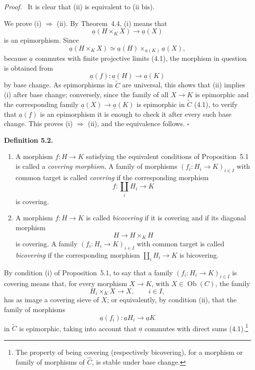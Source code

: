 \documentclass[11pt]{article}
\newcommand{\Ob}{\operatorname{Ob}}
\newcommand{\qedtext}{\hfill\(\square\)}
\newenvironment{statement}[1]{\par\medskip\noindent\textbf{#1.}\ }{\par\medskip}
\newenvironment{prooftext}{\par\noindent\emph{Proof.}\ }{\par\medskip}
\begin{document}
\begin{prooftext}
It is clear that (ii) is equivalent to (ii bis).

We prove (i) \(\Rightarrow\) (ii). By Theorem~4.4, (i) means that
\[
\underline a(H\times_KX)\to \underline a(X)
\]
is an epimorphism. Since
\[
\underline a(H\times_KX)\simeq
\underline a(H)\times_{\underline a(K)}\underline a(X),
\]
because \(\underline a\) commutes with finite projective limits (4.1), the morphism in question is obtained from
\[
\underline a(f):\underline a(H)\to \underline a(K)
\]
by base change. As epimorphisms in \(\widetilde C\) are universal, this shows that (ii) implies (i) after base change; conversely, since the family of all \(X\to K\) is epimorphic and the corresponding family \(\underline a(X)\to\underline a(K)\) is epimorphic in \(\widetilde C\) (4.1), to verify that \(\underline a(f)\) is an epimorphism it is enough to check it after every such base change. This proves (i) \(\Rightarrow\) (ii), and the equivalence follows. \qedtext
\end{prooftext}

\begin{statement}{Definition 5.2}
\begin{enumerate}[label=\arabic*)]
\item A morphism \(f:H\to K\) satisfying the equivalent conditions of Proposition~5.1 is called a \emph{covering morphism}. A family of morphisms \((f_i:H_i\to K)_{i\in I}\) with common target is called \emph{covering} if the corresponding morphism
\[
f:\coprod_iH_i\to K
\]
is covering.
\item A morphism \(f:H\to K\) is called \emph{bicov\-ering} if it is covering and if its diagonal morphism
\[
H\to H\times_KH
\]
is covering. A family \((f_i:H_i\to K)_{i\in I}\) with common target is called \emph{bicov\-ering} if the corresponding morphism \(\coprod_iH_i\to K\) is bicov\-ering.
\end{enumerate}
\end{statement}

By condition (i) of Proposition~5.1, to say that a family \((f_i:H_i\to K)_{i\in I}\) is covering means that, for every morphism \(X\to K\), with \(X\in\Ob(C)\), the family
\[
H_i\times_KX\to X,\qquad i\in I,
\]
has as image a covering sieve of \(X\); or equivalently, by condition (ii), that the family of morphisms
\[
\underline a(f_i):\underline aH_i\to \underline aK
\]
in \(\widetilde C\) is epimorphic, taking into account that \(\underline a\) commutes with direct sums (4.1).\footnote{The property of being covering (respectively bicov\-ering), for a morphism or family of morphisms of \(\widehat C\), is stable under base change.}
\end{document}

